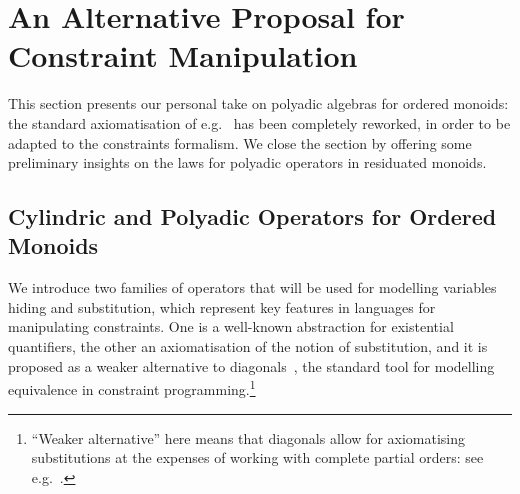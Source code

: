 \documentclass{llncs}
\newcommand{\comment}[1]{}
\def\odiv{\, {\ominus\hspace{-7.7pt} \div} \,}
\begin{document}
\comment{
\begin{example}
\label{notdistr}
Let us consider the monoid $S = \langle \{p,u,n,t\}, \otimes_s, u \rangle$ (with $t$ the top 
of three otherwise unrelated elements): 
$p$ and $n$ intuitively represent the sign of an integer, $t$ tells us that 
the sign cannot be determined, $u$ is the zero
and $\otimes_s$ (which is idempotent) tells us the sign of the addition of two integers, so that 
for all elements $x$ we have
\[x \otimes_s x = u \otimes_s x = x \mbox{  and  } t \otimes_s x = p \otimes_s n = t\]
%
We now add the bottom, in order to obtain a complete lattice.
The $\otimes_s$ is extended in the expected way,  so that $\bot$ is absorbing.
%
Intuitively, $\bot$ states that an element is unsigned:
a pattern the reader familiar with abstract interpretation formalisms will recognise.

The resulting semi-lattice monoid is residuated, with $\odiv$ defined as

$$x \odiv y = \bigg \{\begin{array}{ll}
	t & y \leq x \\
	\bot & \ otherwise
	\end{array}$$
%
Thus, $\odiv$ does not distribute, since 
$\bigvee \{p \odiv n, u \odiv n\}  = \bot < \bigvee \{p, u\} \odiv n = t \odiv n = t$.
\end{example}
}

\section{An Alternative Proposal for Constraint Manipulation}
\label{newpro}

This section presents our personal take on polyadic algebras for ordered monoids:
the standard axiomatisation of e.g.~\cite{sagi2013} has been completely 
reworked, in order to be adapted to the constraints formalism.
%
We close the section by offering some preliminary insights on 
the laws for polyadic operators in residuated monoids.

\subsection{Cylindric and Polyadic Operators for Ordered Monoids}
\label{cypo}
We  introduce two families of operators 
that will be used
for modelling variables hiding and substitution, which represent
key features in languages for manipulating constraints.
%
One is a well-known abstraction for existential quantifiers,
the other an axiomatisation of the notion of
substitution, and it is proposed as a weaker  alternative 
to diagonals~\cite{popl91}, the standard tool for modelling 
equivalence in constraint programming.\footnote{``Weaker 
alternative'' here means that diagonals allow for axiomatising
substitutions at the expenses of working with complete
partial orders: see e.g.~\cite[Definition 11]{jlamp17}.}
%
\end{document}
